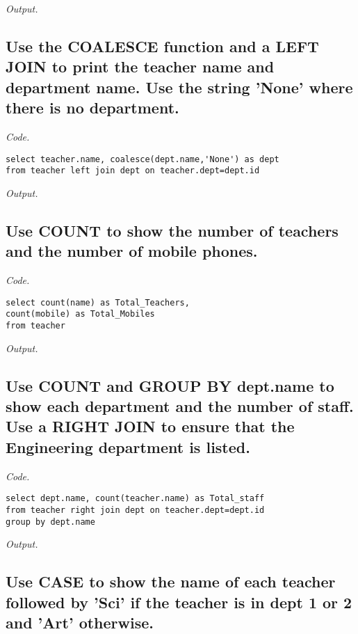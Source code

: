 \documentclass[12pt]{article}
\begin{document}
\textit{Output.}\\

\subsection{Use the COALESCE function and a LEFT JOIN to print the teacher name and department name. Use the string 'None' where there is no department.}

\textit{Code.}

\begin{lstlisting}[showstringspaces=false]
select teacher.name, coalesce(dept.name,'None') as dept
from teacher left join dept on teacher.dept=dept.id
\end{lstlisting}

\textit{Output.}\\

\subsection{Use COUNT to show the number of teachers and the number of mobile phones.}

\textit{Code.}

\begin{lstlisting}[showstringspaces=false]
select count(name) as Total_Teachers,
count(mobile) as Total_Mobiles 
from teacher
\end{lstlisting}

\textit{Output.}\\

\subsection{Use COUNT and GROUP BY dept.name to show each department and the number of staff. Use a RIGHT JOIN to ensure that the Engineering department is listed.}

\textit{Code.}

\begin{lstlisting}[showstringspaces=false]
select dept.name, count(teacher.name) as Total_staff
from teacher right join dept on teacher.dept=dept.id
group by dept.name
\end{lstlisting}

\textit{Output.}\\

\subsection{Use CASE to show the name of each teacher followed by 'Sci' if the teacher is in dept 1 or 2 and 'Art' otherwise.}
\end{document}
